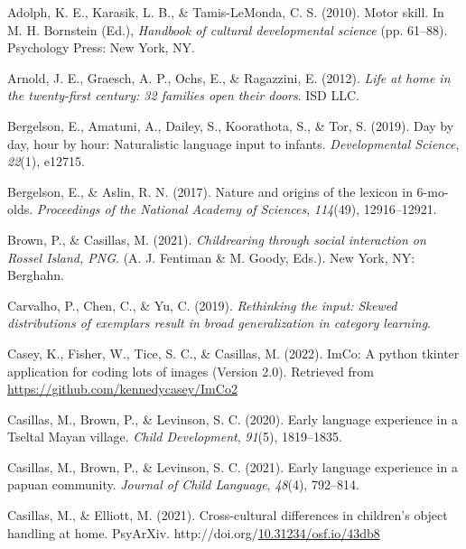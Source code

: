 \documentclass[10pt, letterpaper]{article}
\newenvironment{CSLReferences}%
  {}%
  {\par}
\begin{document}
\hypertarget{refs}{}
\begin{CSLReferences}{1}{0}
\leavevmode\hypertarget{ref-adolph2010motor}{}%
Adolph, K. E., Karasik, L. B., \& Tamis-LeMonda, C. S. (2010). Motor
skill. In M. H. Bornstein (Ed.), \emph{Handbook of cultural
developmental science} (pp. 61--88). Psychology Press: New York, NY.

\leavevmode\hypertarget{ref-arnold2012life}{}%
Arnold, J. E., Graesch, A. P., Ochs, E., \& Ragazzini, E. (2012).
\emph{Life at home in the twenty-first century: 32 families open their
doors}. ISD LLC.

\leavevmode\hypertarget{ref-bergelson2019day}{}%
Bergelson, E., Amatuni, A., Dailey, S., Koorathota, S., \& Tor, S.
(2019). Day by day, hour by hour: Naturalistic language input to
infants. \emph{Developmental Science}, \emph{22}(1), e12715.

\leavevmode\hypertarget{ref-bergelson2017nature}{}%
Bergelson, E., \& Aslin, R. N. (2017). Nature and origins of the lexicon
in 6-mo-olds. \emph{Proceedings of the National Academy of Sciences},
\emph{114}(49), 12916--12921.

\leavevmode\hypertarget{ref-brownIPchildrearing}{}%
Brown, P., \& Casillas, M. (2021). \emph{Childrearing through social
interaction on {Rossel Island, PNG}}. (A. J. Fentiman \& M. Goody,
Eds.). New York, NY: Berghahn.

\leavevmode\hypertarget{ref-carvalho2019rethinking}{}%
Carvalho, P., Chen, C., \& Yu, C. (2019). \emph{Rethinking the input:
Skewed distributions of exemplars result in broad generalization in
category learning}.

\leavevmode\hypertarget{ref-casey2022imco}{}%
Casey, K., Fisher, W., Tice, S. C., \& Casillas, M. (2022). ImCo: A
python tkinter application for coding lots of images (Version 2.0).
Retrieved from \url{https://github.com/kennedycasey/ImCo2}

\leavevmode\hypertarget{ref-casillas2020early}{}%
Casillas, M., Brown, P., \& Levinson, S. C. (2020). Early language
experience in a {Tseltal Mayan} village. \emph{Child Development},
\emph{91}(5), 1819--1835.

\leavevmode\hypertarget{ref-casillas2021early}{}%
Casillas, M., Brown, P., \& Levinson, S. C. (2021). Early language
experience in a papuan community. \emph{Journal of Child Language},
\emph{48}(4), 792--814.

\leavevmode\hypertarget{ref-casillasURdaylong}{}%
Casillas, M., \& Elliott, M. (2021). Cross-cultural differences in
children's object handling at home. PsyArXiv.
http://doi.org/\href{https://doi.org/10.31234/osf.io/43db8}{10.31234/osf.io/43db8}


\end{CSLReferences}
\end{document}
